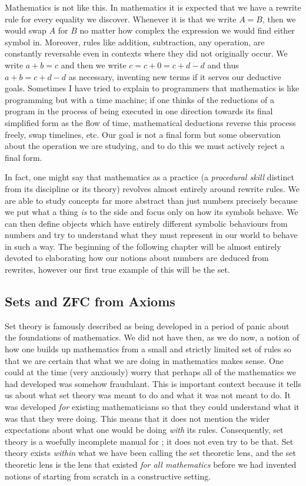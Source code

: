 \documentclass[11pt]{article}
\begin{document}
Mathematics is not like this. In mathematics it is expected that we have a rewrite rule for every equality we discover. Whenever it is that we write $A = B$, then we would swap $A$ for $B$ no matter how complex the expression we would find either symbol in. Moreover, rules like addition, subtraction, any operation, are constantly reversable even in contexts where they did not originally occur. We write $a + b = c$ and then we write $c = c + 0 = c + d - d$ and thus $a + b = c + d - d$ as necessary, inventing new terms if it serves our deductive goals. Sometimes I have tried to explain to programmers that mathematics is like programming but with a time machine; if one thinks of the reductions of a program in the process of being executed in one direction towards its final simplified form as the flow of time, mathematical deductions reverse this process freely, swap timelines, etc. Our goal is not a final form but some observation about the operation we are studying, and to do this we must actively reject a final form.

In fact, one might say that mathematics as a practice (a \emph{procedural skill} distinct from its discipline or its theory) revolves almost entirely around rewrite rules. We are able to study concepts far more abstract than just numbers precisely because we put what a thing \emph{is} to the side and focus only on how its symbols behave. We can then define objects which have entirely different symbolic behaviours from numbers and try to understand what they must represent in our world to behave in such a way. The beginning of the following chapter will be almost entirely devoted to elaborating how our notions about numbers are deduced from rewrites, however our first true example of this will be the set.

\subsection{Sets and ZFC from Axioms}

Set theory is famously described as being developed in a period of panic about the foundations of mathematics. We did not have then, as we do now, a notion of how one builds up mathematics from a small and strictly limited set of rules so that we are certain that what we are doing in mathematics makes sense. One could at the time (very anxiously) worry that perhaps all of the mathematics we had developed was somehow fraudulant. This is important context because it tells us about what set theory was meant to do and what it was not meant to do. It was developed \emph{for} existing mathematicians so that they could understand what it was that they were doing. This means that it does not mention the wider expectations about what one would be doing \emph{with} its rules. Consequently, set theory is a woefully incomplete manual for ; it does not even try to be that. Set theory exists \emph{within} what we have been calling the set theoretic lens, and the set theoretic lens is the lens that existed \emph{for all mathematics} before we had invented notions of starting from scratch in a constructive setting.
\end{document}
